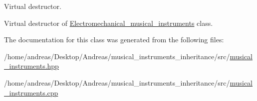 Virtual destructor. 

Virtual destructor of \hyperlink{classElectromechanical__musical__instruments}{Electromechanical\+\_\+musical\+\_\+instruments} class. 

The documentation for this class was generated from the following files\+:\begin{DoxyCompactItemize}
\item 
/home/andreas/\+Desktop/\+Andreas/musical\+\_\+instruments\+\_\+inheritance/src/\hyperlink{musical__instruments_8hpp}{musical\+\_\+instruments.\+hpp}\item 
/home/andreas/\+Desktop/\+Andreas/musical\+\_\+instruments\+\_\+inheritance/src/\hyperlink{musical__instruments_8cpp}{musical\+\_\+instruments.\+cpp}\end{DoxyCompactItemize}
